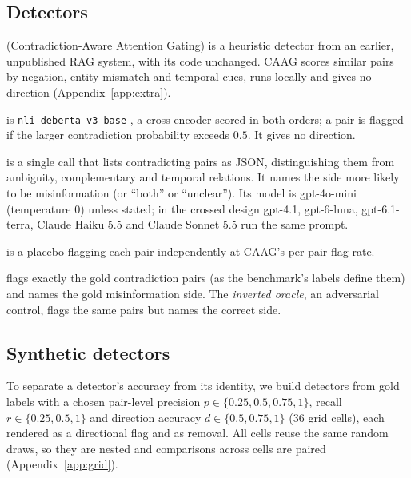\subsection{Detectors}
\label{sec:detectors}
\begin{description}[leftmargin=0pt,itemsep=1pt,topsep=2pt]
\item[CAAG] (Contradiction-Aware Attention Gating) is a heuristic detector from an earlier, unpublished RAG system,
with its code unchanged. CAAG scores similar pairs by negation, entity-mismatch and temporal cues, runs locally
and gives no direction (Appendix~\ref{app:extra}).
\item[NLI] is \texttt{nli-deberta-v3-base} \citep{he2023debertav3}, a cross-encoder scored in both orders; a pair is
flagged if the larger contradiction probability exceeds $0.5$. It gives no direction.
\item[LLM] is a single call that lists contradicting pairs as JSON, distinguishing them from ambiguity, complementary and
temporal relations. It names the side more likely to be misinformation (or ``both'' or ``unclear''). Its model is
gpt-4o-mini (temperature 0) unless stated; in the crossed design gpt-4.1, gpt-6-luna, gpt-6.1-terra, Claude Haiku 5.5
and Claude Sonnet 5.5 run the same prompt.
\item[Random] is a placebo flagging each pair independently at CAAG's per-pair flag rate.
\item[Oracle] flags exactly the gold contradiction pairs (as the benchmark's labels define them) and names the gold
misinformation side. The
\emph{inverted oracle}, an adversarial control, flags the same pairs but names the correct side.
\end{description}

\subsection{Synthetic detectors}
\label{sec:synthetic}
To separate a detector's accuracy from its identity, we build detectors from gold labels with a chosen pair-level
precision $p\in\{0.25,0.5,0.75,1\}$, recall $r\in\{0.25,0.5,1\}$ and direction accuracy $d\in\{0.5,0.75,1\}$ (36
grid cells), each rendered as a directional flag and as removal. All cells reuse the same random draws, so they are nested
and comparisons across cells are paired (Appendix~\ref{app:grid}).
